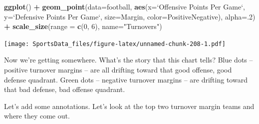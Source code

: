 \documentclass[]{book}
\newenvironment{Shaded}{\begin{snugshade}}{\end{snugshade}}
\newcommand{\DataTypeTok}[1]{\textcolor[rgb]{0.13,0.29,0.53}{#1}}
\newcommand{\DecValTok}[1]{\textcolor[rgb]{0.00,0.00,0.81}{#1}}
\newcommand{\KeywordTok}[1]{\textcolor[rgb]{0.13,0.29,0.53}{\textbf{#1}}}
\newcommand{\NormalTok}[1]{#1}
\newcommand{\OperatorTok}[1]{\textcolor[rgb]{0.81,0.36,0.00}{\textbf{#1}}}
\newcommand{\StringTok}[1]{\textcolor[rgb]{0.31,0.60,0.02}{#1}}
\begin{document}
\begin{Shaded}
\begin{Highlighting}[]
\KeywordTok{ggplot}\NormalTok{() }\OperatorTok{+}\StringTok{ }\KeywordTok{geom_point}\NormalTok{(}\DataTypeTok{data=}\NormalTok{football, }\KeywordTok{aes}\NormalTok{(}\DataTypeTok{x=}\StringTok{`}\DataTypeTok{Offensive Points Per Game}\StringTok{`}\NormalTok{, }\DataTypeTok{y=}\StringTok{`}\DataTypeTok{Defensive Points Per Game}\StringTok{`}\NormalTok{, }\DataTypeTok{size=}\NormalTok{Margin, }\DataTypeTok{color=}\NormalTok{PositiveNegative), }\DataTypeTok{alpha=}\NormalTok{.}\DecValTok{2}\NormalTok{) }\OperatorTok{+}\StringTok{ }\KeywordTok{scale_size}\NormalTok{(}\DataTypeTok{range =} \KeywordTok{c}\NormalTok{(}\DecValTok{0}\NormalTok{, }\DecValTok{6}\NormalTok{), }\DataTypeTok{name=}\StringTok{"Turnovers"}\NormalTok{)}
\end{Highlighting}
\end{Shaded}

\texttt{[image: SportsData\_files/figure-latex/unnamed-chunk-208-1.pdf]}

Now we're getting somewhere. What's the story that this chart tells? Blue dots -- positive turnover margins -- are all drifting toward that good offense, good defense quadrant. Green dots -- negative turnover margins -- are drifting toward that bad defense, bad offense quadrant.

Let's add some annotations. Let's look at the top two turnover margin teams and where they come out.

\begin{Shaded}
\end{Shaded}
\end{document}
